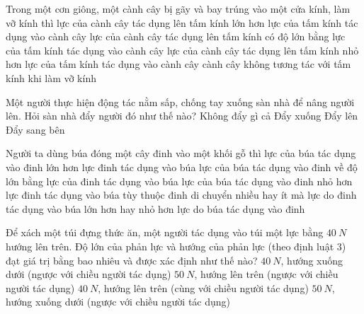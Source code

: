 \begin{ex}%
Trong một cơn giông, một cành cây bị gãy và bay trúng vào một cửa kính, làm vỡ kính thì
\choice
{lực của cành cây tác dụng lên tấm kính lớn hơn lực của tấm kính tác dụng vào cành cây}
{\True lực của cành cây tác dụng lên tấm kính có độ lớn bằng lực của tấm kính tác dụng vào cành cây}
{lực của cành cây tác dụng lên tấm kính nhỏ hơn lực của tấm kính tác dụng vào cành cây}
{cành cây không tương tác với tấm kính khi làm vỡ kính}
 \end{ex}
\begin{ex}%
Một người thực hiện động tác nằm sấp, chống tay xuống sàn nhà để nâng người lên. Hỏi sàn nhà đẩy người đó như thế nào?
\choice
{Không đẩy gì cả}
{Đẩy xuống}
{\True Đẩy lên}
{Đẩy sang bên}
\loigiai{
}
 \end{ex}
\begin{ex}%
Người ta dùng búa đóng một cây đinh vào một khối gỗ thì
\choice
{lực của búa tác dụng vào đinh lớn hơn lực đinh tác dụng vào búa}
{\True lực của búa tác dụng vào đinh về độ lớn bằng lực của đinh tác dụng vào búa}
{lực của búa tác dụng vào đinh nhỏ hơn lực đinh tác dụng vào búa}
{tùy thuộc đinh di chuyển nhiều hay ít mà lực do đinh tác dụng vào búa lớn hơn hay nhỏ hơn lực do búa tác dụng vào đinh}
 \end{ex}
\begin{ex}%
Để xách một túi đựng thức ăn, một người tác dụng vào túi một lực bằng $40\ N$ hướng lên trên. Độ lớn của phản lực và hướng của phản lực (theo định luật 3) đạt giá trị bằng bao nhiêu và được xác định như thế nào?
\choice
{\True $40\ N$, hướng xuống dưới (ngược với chiều người tác dụng)}
{$50\ N$, hướng lên trên (ngược với chiều người tác dụng)}
{$40\ N$, hướng lên trên (cùng với chiều người tác dụng)}
{$50\ N$, hướng xuống dưới (ngược với chiều người tác dụng)}
 \end{ex}
